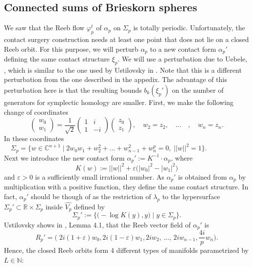 \documentclass[a4paper,12pt,bibliography=totocnumbered,titlepage=false,abstracton,bookmarksnumbered=true]{scrartcl}
\newcommand{\veps}{\varepsilon}
\theoremstyle{definition}
\begin{document}
\subsection{Connected sums of Brieskorn spheres}\label{secConSum}
We saw that the Reeb flow $\varphi_p^t$ of $\alpha_p$ on $\Sigma_p$ is totally periodic. Unfortunately, the contact surgery construction needs at least one point that does not lie on a closed Reeb orbit. For this purpose, we will perturb $\alpha_p$ to a new contact form $\alpha_p'$ defining the same contact structure $\xi_p$. We will use a perturbation due to Uebele, \cite{Ueb}, which is similar to the one used by Ustilovsky in \cite{Usti}. Note that this is a different perturbation from the one described in the appedix. The advantage of this perturbation here is that the resulting bounds $b_k(\xi_p')$ on the number of generators for symplectic homology are smaller. First, we make the following change of coordinates
\begin{equation}\label{UstiPer}
\begin{pmatrix}w_0\\w_1\end{pmatrix}=\frac{1}{\sqrt{2}}\begin{pmatrix}1 & i\\1& -i\end{pmatrix}\begin{pmatrix}z_0\\z_1\end{pmatrix},\quad w_2=z_2,\quad\dots\quad,\quad w_n=z_n.
\end{equation}
In these coordinates $\displaystyle\quad\Sigma_p=\Big\{w\in\mathbb{C}^{n+1}\;\Big|\; 2w_0w_1+w_2^2+...+w_{n-1}^2+w_n^p=0,\; ||w||^2=1\Big\}.$\bigskip\\
Next we introduce the new contact form $\alpha_p':=K^{-1}{\cdot} \alpha_p$, where
\[K(w):=||w||^2+\veps\big(|w_0|^2-|w_1|^2\big)\]
and $\veps>0$ is a sufficiently small irrational number. As $\alpha_p'$ is obtained from $\alpha_p$ by multiplication with a positive function, they define the same contact structure. In fact, $\alpha_p'$ should be though of as the restriction of $\lambda_p$  to the hypersurface $\Sigma_p'\subset \mathbb{R}{\times}\Sigma_p$ inside $\widehat{V_p}$ defined by
\[\Sigma_p':=\Big\{\big({-}\log K(y),y\big)\;\Big|\;y\in\Sigma_p\Big\}.\]
Ustilovsky shows in \cite{Usti}, Lemma 4.1, that the Reeb vector field of $\alpha_p'$ is
\[R_p'=\Big(\;2i(1{+}\veps)w_0, 2i(1{-}\veps)w_1,2iw_2,\,...,\,2iw_{n-1},\frac{4i}{p}w_n\Big).\]
Hence, the closed Reeb orbits form 4 different types of manifolds parametrized by $L\in\mathbb{N}$:
\end{document}
